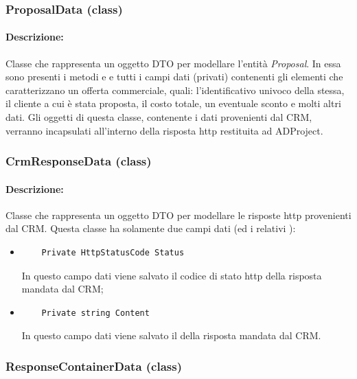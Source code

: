 \subsubsection{ProposalData (class)}
\paragraph{Descrizione:}
Classe che rappresenta un oggetto DTO per modellare l'entità \textit{Proposal}.
In essa sono presenti i metodi  e  e tutti i campi dati (privati) contenenti gli elementi che caratterizzano un offerta commerciale, quali: l'identificativo univoco della stessa, il cliente a cui è stata proposta, il costo totale, un eventuale sconto e molti altri dati.
Gli oggetti di questa classe, contenente i dati provenienti dal CRM, verranno incapsulati all'interno della risposta http restituita ad ADProject.

\subsubsection{CrmResponseData (class)} \label{crmResponseDataClass}
\paragraph{Descrizione:}
Classe che rappresenta un oggetto DTO per modellare le risposte http provenienti dal CRM.
Questa classe ha solamente due campi dati (ed i relativi ):
\begin{itemize}
	\item 	
	\begin{lstlisting}
	Private HttpStatusCode Status
	\end{lstlisting}
	In questo campo dati viene salvato il codice di stato http della risposta mandata dal CRM;
	\item
	\begin{lstlisting}
	Private string Content
	\end{lstlisting}
	In questo campo dati viene salvato il  della risposta mandata dal CRM.
\end{itemize}

\subsubsection{ResponseContainerData (class)} \label{responseContainerDataClass}
